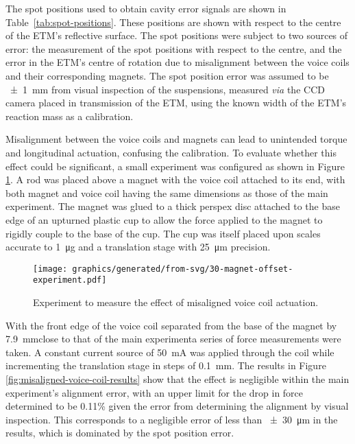 The spot positions used to obtain cavity error signals are shown in Table~\ref{tab:spot-positions}. These positions are shown with respect to the centre of the \gls{ETM}'s reflective surface. The spot positions were subject to two sources of error: the measurement of the spot positions with respect to the centre, and the error in the \gls{ETM}'s centre of rotation due to misalignment between the voice coils and their corresponding magnets. The spot position error was assumed to be \SI{\pm1}{\milli\meter} from visual inspection of the suspensions, measured \emph{via} the CCD camera placed in transmission of the \gls{ETM}, using the known width of the \gls{ETM}'s reaction mass as a calibration.

Misalignment between the voice coils and magnets can lead to unintended torque and longitudinal actuation, confusing the calibration. To evaluate whether this effect could be significant, a small experiment was configured as shown in Figure\,\ref{fig:misaligned-voice-coil-experiment}. A rod was placed above a magnet with the voice coil attached to its end, with both magnet and voice coil having the same dimensions as those of the main experiment. The magnet was glued to a thick perspex disc attached to the base edge of an upturned plastic cup to allow the force applied to the magnet to rigidly couple to the base of the cup. The cup was itself placed upon scales accurate to \SI{1}{\micro\gram} and a translation stage with \SI{25}{\micro\meter} precision.

\begin{figure}
  \centering
  \texttt{[image: graphics/generated/from-svg/30-magnet-offset-experiment.pdf]}
  \caption{\label{fig:misaligned-voice-coil-experiment}Experiment to measure the effect of misaligned voice coil actuation.}
\end{figure}

With the front edge of the voice coil separated from the base of the magnet by \SI{7.9}{\milli\meter}\textemdash close to that of the main experiment\textemdash a series of force measurements were taken. A constant current source of \SI{50}{\milli\ampere} was applied through the coil while incrementing the translation stage in steps of \SI{0.1}{\milli\meter}. The results in Figure\,\ref{fig:misaligned-voice-coil-results} show that the effect is negligible within the main experiment's alignment error, with an upper limit for the drop in force determined to be \SI{0.11}{}\% given the error from determining the alignment by visual inspection. This corresponds to a negligible error of less than \SI{\pm30}{\micro\meter} in the results, which is dominated by the spot position error.

